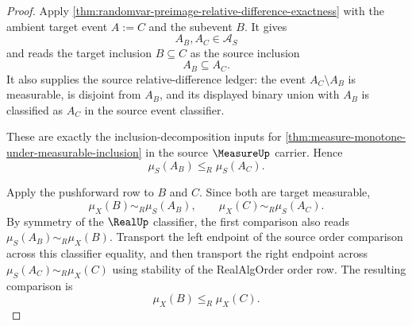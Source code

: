 \begin{proof}
Apply \autoref{thm:randomvar-preimage-relative-difference-exactness} with the ambient target event $A:=C$ and the subevent $B$. It gives
$$
A_B,A_C\in\mathcal{A}_S
$$
and reads the target inclusion $B\subseteq C$ as the source inclusion
$$
A_B\subseteq A_C.
$$
It also supplies the source relative-difference ledger: the event $A_C\setminus A_B$ is measurable, is disjoint from $A_B$, and its displayed binary union with $A_B$ is classified as $A_C$ in the source event classifier.

These are exactly the inclusion-decomposition inputs for \autoref{thm:measure-monotone-under-measurable-inclusion} in the source $\MeasureUp$ carrier. Hence
$$
\mu_S(A_B)\le_R\mu_S(A_C).
$$

Apply the pushforward row to $B$ and $C$. Since both are target measurable,
$$
\mu_X(B)\sim_R\mu_S(A_B),\qquad \mu_X(C)\sim_R\mu_S(A_C).
$$
By symmetry of the $\RealUp$ classifier, the first comparison also reads $\mu_S(A_B)\sim_R\mu_X(B)$. Transport the left endpoint of the source order comparison across this classifier equality, and then transport the right endpoint across $\mu_S(A_C)\sim_R\mu_X(C)$ using stability of the RealAlgOrder order row. The resulting comparison is
$$
\mu_X(B)\le_R\mu_X(C).
$$
\end{proof}

